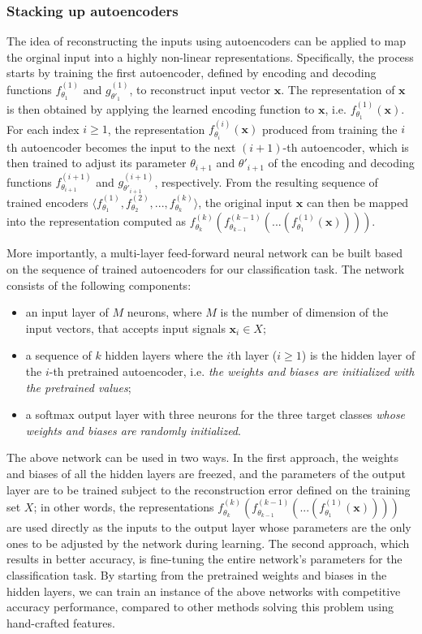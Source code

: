 \documentclass[12pt]{article}
\newcommand{\myvec}[1]{\mathbf{#1}}
\begin{document}
\subsubsection{Stacking up autoencoders}
\noindent
The idea of reconstructing the inputs using autoencoders can be applied to map the orginal input into a highly non-linear representations. Specifically, the process starts by training the first autoencoder, defined by encoding and decoding functions $f^{(1)}_{\theta_1}$ and $g^{(1)}_{\theta'_1}$, to reconstruct input vector $\myvec{x}$. The representation of $\myvec{x}$ is then obtained by applying the learned encoding function to $\myvec{x}$, i.e. $f^{(1)}_{\theta_1}(\myvec{x})$. For each index $i \geq 1$, the representation $f^{(i)}_{\theta_i}(\myvec{x})$ produced from training the $i$th autoencoder becomes the input to the next $(i+1)$-th autoencoder, which is then trained to adjust its parameter $\theta_{i+1}$ and  $\theta'_{i+1}$ of the encoding and decoding functions $f^{(i+1)}_{\theta_{i+1}}$ and $g^{(i+1)}_{\theta'_{i+1}}$, respectively. From the resulting sequence of trained encoders $\langle f^{(1)}_{\theta_1}, f^{(2)}_{\theta_2}, ..., f^{(k)}_{\theta_k} \rangle$, the original input $\myvec{x}$ can then be mapped into the representation computed as $f^{(k)}_{\theta_k}(f^{(k-1)}_{\theta_{k-1}}(...(f^{(1)}_{\theta_1}(\myvec{x}))))$.

More importantly, a multi-layer feed-forward neural network can be built based on the sequence of trained autoencoders for our classification task. The network consists of the following components:
\begin{itemize}
\item an input layer of $M$ neurons, where $M$ is the number of dimension of the input vectors, that accepts input signals $\myvec{x}_i \in X$;
\item a sequence of $k$ hidden layers where the $i$th layer ($i \geq 1$) is the hidden layer of the $i$-th pretrained autoencoder, i.e. \textit{the weights and biases are initialized with the pretrained values};
\item a softmax output layer with three neurons for the three target classes \textit{whose weights and biases are randomly initialized}.
\end{itemize}

The above network can be used in two ways. In the first approach, the weights and biases of all the hidden layers are freezed, and the parameters of the output layer are to be trained subject to the reconstruction error defined on the training set $X$; in other words, the representations $f^{(k)}_{\theta_k}(f^{(k-1)}_{\theta_{k-1}}(...(f^{(1)}_{\theta_1}(\myvec{x}))))$ are used directly as the inputs to the output layer whose parameters are the only ones to be adjusted by the network during learning. The second approach, which results in better accuracy, is fine-tuning the entire network's parameters for the classification task. By starting from the pretrained weights and biases in the hidden layers, we can train an instance of the above networks with competitive accuracy performance, compared to other methods solving this problem using hand-crafted features.
\end{document}
